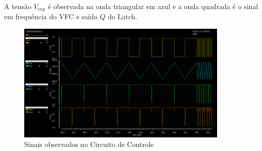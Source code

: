 A tensão $V_{cap}$ é observada na onda triangular em azul e a onda quadrada é o sinal em frequência do VFC e saída $Q$ do Latch.

\begin{figure}[htb]
	\centering
	\includegraphics[width=0.9\textwidth]{figuras/sim_controle.png}
	\caption{Sinais observados no Circuito de Controle }
	\label{fig18}
\end{figure}



